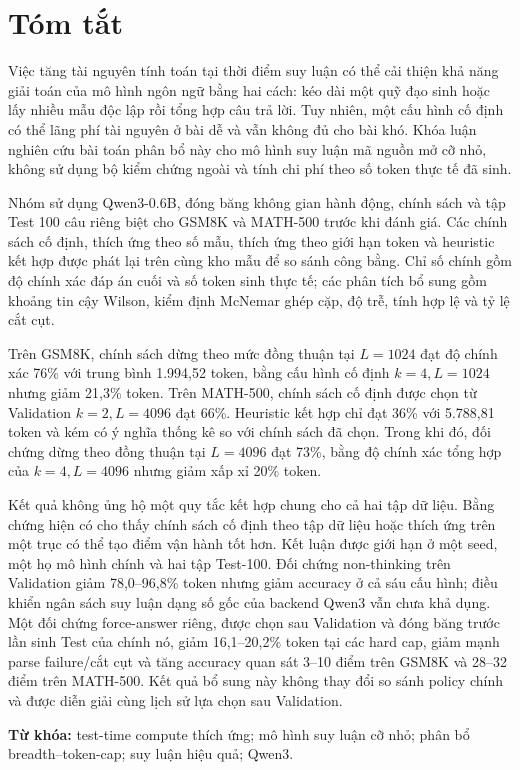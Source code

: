 \chapter*{Tóm tắt}

Việc tăng tài nguyên tính toán tại thời điểm suy luận có thể cải thiện khả năng
giải toán của mô hình ngôn ngữ bằng hai cách: kéo dài một quỹ đạo sinh hoặc lấy
nhiều mẫu độc lập rồi tổng hợp câu trả lời. Tuy nhiên, một cấu hình cố định có
thể lãng phí tài nguyên ở bài dễ và vẫn không đủ cho bài khó. Khóa luận nghiên
cứu bài toán phân bổ này cho mô hình suy luận mã nguồn mở cỡ nhỏ, không sử dụng
bộ kiểm chứng ngoài và tính chi phí theo số token thực tế đã sinh.

Nhóm sử dụng Qwen3-0.6B, đóng băng không gian hành động, chính sách và tập Test
100 câu riêng biệt cho GSM8K và MATH-500 trước khi đánh giá. Các chính sách cố
định, thích ứng theo số mẫu, thích ứng theo giới hạn token và heuristic kết hợp
được phát lại trên cùng kho mẫu để so sánh công bằng. Chỉ số chính gồm độ chính
xác đáp án cuối và số token sinh thực tế; các phân tích bổ sung gồm khoảng tin
cậy Wilson, kiểm định McNemar ghép cặp, độ trễ, tính hợp lệ và tỷ lệ cắt cụt.

Trên GSM8K, chính sách dừng theo mức đồng thuận tại $L=1024$ đạt độ chính xác
76\% với trung bình 1.994,52 token, bằng cấu hình cố định $k=4,L=1024$ nhưng
giảm 21,3\% token. Trên MATH-500, chính sách cố định được chọn từ Validation
$k=2,L=4096$ đạt 66\%. Heuristic kết hợp chỉ đạt 36\% với 5.788,81 token và kém
có ý nghĩa thống kê so với chính sách đã chọn. Trong khi đó, đối chứng dừng theo
đồng thuận tại $L=4096$ đạt 73\%, bằng độ chính xác tổng hợp của
$k=4,L=4096$ nhưng giảm xấp xỉ 20\% token.

Kết quả không ủng hộ một quy tắc kết hợp chung cho cả hai tập dữ liệu. Bằng
chứng hiện có cho thấy chính sách cố định theo tập dữ liệu hoặc thích ứng trên
một trục có thể tạo điểm vận hành tốt hơn. Kết luận được giới hạn ở một seed,
một họ mô hình chính và hai tập Test-100. Đối chứng non-thinking trên
Validation giảm 78,0--96,8\% token nhưng giảm accuracy ở cả sáu cấu hình; điều
khiển ngân sách suy luận dạng số gốc của backend Qwen3 vẫn chưa khả dụng. Một
đối chứng force-answer riêng, được chọn sau Validation và đóng băng trước lần
sinh Test của chính nó, giảm 16,1--20,2\% token tại các hard cap, giảm mạnh
parse failure/cắt cụt và tăng accuracy quan sát 3--10 điểm trên GSM8K và
28--32 điểm trên MATH-500. Kết quả bổ sung này không thay đổi so sánh policy
chính và được diễn giải cùng lịch sử lựa chọn sau Validation.

\noindent\textbf{Từ khóa:} test-time compute thích ứng; mô hình suy luận cỡ nhỏ;
phân bổ breadth--token-cap; suy luận hiệu quả; Qwen3.
